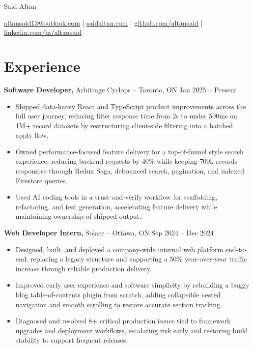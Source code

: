\documentclass[11pt]{article}       %
\begin{document}
\centerline{\Huge Said Altan}

\vspace{10pt}

\centerline{\href{mailto:altansaid13@outlook.com}{altansaid13@outlook.com} | \href{https://saidaltan.com}{saidaltan.com} | \href{https://github.com/altansaid}{github.com/altansaid} | \href{https://www.linkedin.com/in/altansaid}{linkedin.com/in/altansaid}}


\vspace{5pt}
\section*{Experience}
\textbf{Software Developer,} {Arbitrage Cyclops} -- Toronto, ON \hfill Jan 2025 -- Present \\
\vspace{-9pt}
\begin{itemize}
  \item Shipped data-heavy React and TypeScript product improvements across the full user journey, reducing filter response time from 2s to under 500ms on 1M+ record datasets by restructuring client-side filtering into a batched apply flow.
  \item Owned performance-focused feature delivery for a top-of-funnel style search experience, reducing backend requests by 40\% while keeping 700k records responsive through Redux Saga, debounced search, pagination, and indexed Firestore queries.
  \item Used AI coding tools in a trust-and-verify workflow for scaffolding, refactoring, and test generation, accelerating feature delivery while maintaining ownership of shipped output.
\end{itemize}

\textbf{Web Developer Intern,} {Solace} -- Ottawa, ON \hfill Sep 2024 -- Dec 2024 \\
\vspace{-9pt}
\begin{itemize}
  \item Designed, built, and deployed a company-wide internal web platform end-to-end, replacing a legacy structure and supporting a 50\% year-over-year traffic increase through reliable production delivery.
  \item Improved early user experience and software simplicity by rebuilding a buggy blog table-of-contents plugin from scratch, adding collapsible nested navigation and smooth scrolling to restore accurate section tracking.
  \item Diagnosed and resolved 8+ critical production issues tied to framework upgrades and deployment workflows, escalating risk early and restoring build stability to support frequent releases.
\end{itemize}
\end{document}
